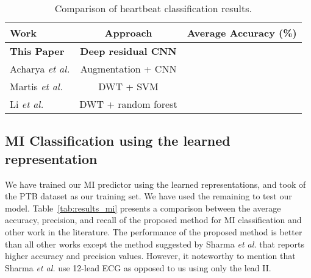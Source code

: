\documentclass[10pt, conference, compsocconf]{IEEEtran}
\begin{document}
\begin{table}[!t]
\renewcommand{\arraystretch}{1.3}
\caption{Comparison of heartbeat classification results.}
\label{tab:results_mitbih}
\centering
\begin{tabular}{lcc}
\hline
\textbf{Work}  & \textbf{Approach} & \textbf{Average Accuracy (\%)} \\
\hline
\hline
\textbf{This Paper} & \textbf{Deep residual CNN} & \bm{} \\

Acharya \textit{et al.} \cite{acharya2017deep} & Augmentation + CNN &   \\

Martis \textit{et al.} \cite{martis2013application} & DWT + SVM &   \\

Li \textit{et al.} \cite{li2016ecg} & DWT + random forest &   \\

\hline
\end{tabular}
\end{table}




\subsection{MI Classification using the learned representation}
We have trained our MI predictor using the learned representations, and took  of the PTB dataset as our training set. We have used the remaining  to test our model. Table~\ref{tab:results_mi} presents a comparison between the average accuracy, precision, and recall of the proposed method for MI classification and other work in the literature. The performance of the proposed method is better than all other works except the method suggested by Sharma \textit{et al.} \cite{sharma2015multiscale} that reports higher accuracy and precision values. However, it noteworthy to mention that Sharma \textit{et al.} use 12-lead ECG as opposed to us using only the lead II.
\end{document}
